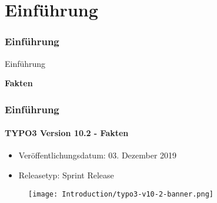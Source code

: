 %

\section{Einführung}
\begin{frame}[fragile]
	\frametitle{Einführung}

	\begin{center}\huge{Einführung}\end{center}
	\begin{center}\huge{\color{typo3darkgrey}\textbf{Fakten}}\end{center}

\end{frame}


\begin{frame}[fragile]
	\frametitle{Einführung}
	\framesubtitle{TYPO3 Version 10.2 - Fakten}

	\begin{itemize}
		\item Veröffentlichungsdatum: 03. Dezember 2019
		\item Releasetyp: Sprint Release
	\end{itemize}

	\begin{figure}
		\texttt{[image: Introduction/typo3-v10-2-banner.png]}
	\end{figure}

\end{frame}


